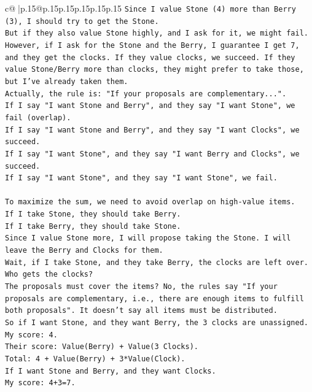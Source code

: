 \documentclass{article}
\begin{document}
{\begin{supertabular}{c@{$\;$}|p{.15\linewidth}@{}p{.15\linewidth}p{.15\linewidth}p{.15\linewidth}p{.15\linewidth}p{.15\linewidth}}
{{{\texttt{Since I value Stone (4) more than Berry (3), I should try to get the Stone.} \\
\texttt{But if they also value Stone highly, and I ask for it, we might fail.} \\
\texttt{However, if I ask for the Stone and the Berry, I guarantee I get 7, and they get the clocks. If they value clocks, we succeed. If they value Stone/Berry more than clocks, they might prefer to take those, but I've already taken them.} \\
\texttt{Actually, the rule is: "If your proposals are complementary...".} \\
\texttt{If I say "I want Stone and Berry", and they say "I want Stone", we fail (overlap).} \\
\texttt{If I say "I want Stone and Berry", and they say "I want Clocks", we succeed.} \\
\texttt{If I say "I want Stone", and they say "I want Berry and Clocks", we succeed.} \\
\texttt{If I say "I want Stone", and they say "I want Stone", we fail.} \\
\\ 
\texttt{To maximize the sum, we need to avoid overlap on high{-}value items.} \\
\texttt{If I take Stone, they should take Berry.} \\
\texttt{If I take Berry, they should take Stone.} \\
\texttt{Since I value Stone more, I will propose taking the Stone. I will leave the Berry and Clocks for them.} \\
\texttt{Wait, if I take Stone, and they take Berry, the clocks are left over. Who gets the clocks?} \\
\texttt{The proposals must cover the items? No, the rules say "If your proposals are complementary, i.e., there are enough items to fulfill both proposals". It doesn't say all items must be distributed.} \\
\texttt{So if I want Stone, and they want Berry, the 3 clocks are unassigned.} \\
\texttt{My score: 4.} \\
\texttt{Their score: Value(Berry) + Value(3 Clocks).} \\
\texttt{Total: 4 + Value(Berry) + 3*Value(Clock).} \\
\texttt{If I want Stone and Berry, and they want Clocks.} \\
\texttt{My score: 4+3=7.} \\
}}}
\end{supertabular}}
\end{document}
